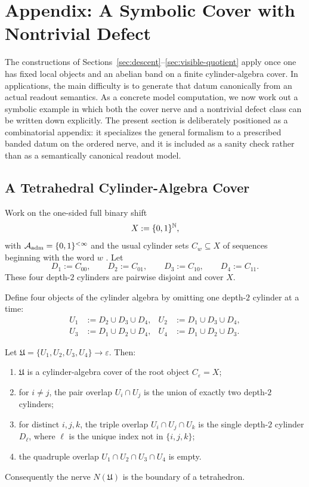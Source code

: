 \section{Appendix: A Symbolic Cover with Nontrivial Defect}
\label{sec:forced-obstruction}

The constructions of Sections~\ref{sec:descent}--\ref{sec:visible-quotient}
apply once one has fixed local objects and an abelian band on a finite
cylinder-algebra cover.  In applications, the main difficulty is to generate
that datum canonically from an actual readout semantics.  As a concrete model
computation, we now work out a symbolic example in which both the cover nerve
and a nontrivial defect class can be written down explicitly.  The present
section is deliberately positioned as a combinatorial appendix: it specializes
the general formalism to a prescribed banded datum on the ordered nerve, and it
is included as a sanity check rather than as a semantically canonical readout
model.

\subsection{A Tetrahedral Cylinder-Algebra Cover}

Work on the one-sided full binary shift
\[
X:=\{0,1\}^{\mathbb{N}},
\]
with $\mathcal{A}_{\mathrm{adm}}=\{0,1\}^{<\infty}$ and the usual cylinder sets
$C_w\subseteq X$ of sequences beginning with the word $w$
\cite[\S 1.2]{LindMarcus1995SymbolicDynamics}.  Let
\[
D_1:=C_{00},\qquad D_2:=C_{01},\qquad D_3:=C_{10},\qquad D_4:=C_{11}.
\]
These four depth-$2$ cylinders are pairwise disjoint and cover $X$.

Define four objects of the cylinder algebra by omitting one depth-$2$ cylinder
at a time:
\[
\begin{aligned}
U_1&:=D_2\cup D_3\cup D_4, &
U_2&:=D_1\cup D_3\cup D_4,\\
U_3&:=D_1\cup D_2\cup D_4, &
U_4&:=D_1\cup D_2\cup D_3.
\end{aligned}
\]

\begin{proposition}
\label{prop:tetrahedral-cover}
Let $\mathfrak{U}=\{U_1,U_2,U_3,U_4\}\to \varepsilon$.  Then:
\begin{enumerate}[label=\textup{(\arabic*)}]
\item $\mathfrak{U}$ is a cylinder-algebra cover of the root object $C_\varepsilon=X$;
\item for $i\neq j$, the pair overlap $U_i\cap U_j$ is the union of exactly two
depth-$2$ cylinders;
\item for distinct $i,j,k$, the triple overlap $U_i\cap U_j\cap U_k$ is the
single depth-$2$ cylinder $D_\ell$, where $\ell$ is the unique index not in
$\{i,j,k\}$;
\item the quadruple overlap $U_1\cap U_2\cap U_3\cap U_4$ is empty.
\end{enumerate}
Consequently the nerve $N(\mathfrak{U})$ is the boundary of a tetrahedron.
\end{proposition}

